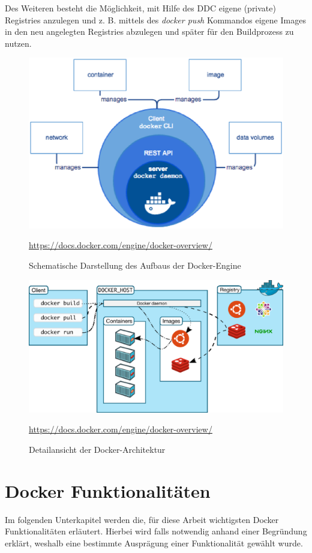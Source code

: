 Des Weiteren besteht die Möglichkeit, mit Hilfe des \ac{DDC} eigene (private) Registries anzulegen und z. B. mittels des \textit{docker push} Kommandos eigene Images in den neu angelegten Registries abzulegen und später für den Buildprozess zu nutzen.

\begin{figure}
	\centering
	\includegraphics[width=0.7\linewidth]{figures/DockerEngine}
	\caption[Aufbau Docker-Engine]{Schematische Darstellung des Aufbaus der Docker-Engine}
	\label{fig:dockerengine}
	\tiny{\quelle\url{https://docs.docker.com/engine/docker-overview/}}
\end{figure}

\begin{figure}
	\centering
	\includegraphics[width=0.7\linewidth]{figures/DockerArchitecture}
	\caption[Detailansicht der Docker-Architektur]{Detailansicht der Docker-Architektur}
	\label{fig:dockerarchitecture}
	\tiny{\quelle\url{https://docs.docker.com/engine/docker-overview/}}
\end{figure}

\section{Docker Funktionalitäten}
\label{c:funktionalität}

Im folgenden Unterkapitel werden die, für diese Arbeit wichtigsten Docker Funktionalitäten erläutert.
Hierbei wird falls notwendig anhand einer Begründung erklärt, weshalb eine bestimmte Ausprägung einer Funktionalität gewählt wurde.


